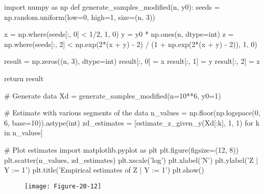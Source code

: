\begin{python}
import numpy as np
def generate_samples_modified(n, y0):
    seeds = np.random.uniform(low=0, high=1, size=(n, 3))
    
    x = np.where(seeds[:, 0] < 1/2, 1, 0)
    y = y0 * np.ones(n, dtype=int)
    z = np.where(seeds[:, 2] < np.exp(2*(x + y) - 2) / (1 + np.exp(2*(x + y) - 2)), 1, 0)
    
    result = np.zeros((n, 3), dtype=int)
    result[:, 0] = x
    result[:, 1] = y
    result[:, 2] = z
    
    return result
\end{python}

\begin{python}
# Generate data
Xd = generate_samples_modified(n=10**6, y0=1)
\end{python}

\begin{python}
# Estimate with various segments of the data
n_values = np.floor(np.logspace(0, 6, base=10)).astype(int)
zd_estimates = [estimate_z_given_y(Xd[:k], 1, 1) for k in n_values]
\end{python}

\begin{python}
# Plot estimates
import matplotlib.pyplot as plt
plt.figure(figsize=(12, 8))
plt.scatter(n_values, zd_estimates)
plt.xscale('log')
plt.xlabel('N')
plt.ylabel('Z | Y := 1')
plt.title('Empirical estimates of Z | Y := 1')
plt.show()
\end{python}

\begin{figure}[H]
\centering
\texttt{[image: Figure-20-12]}
\end{figure}


